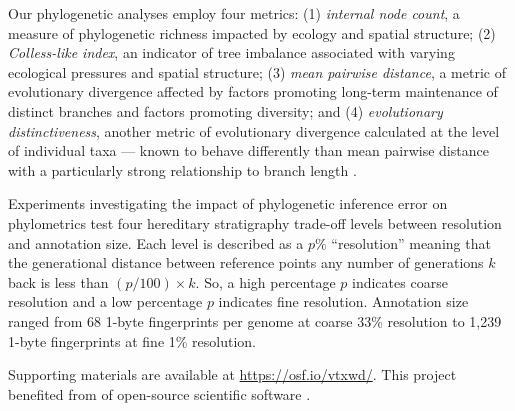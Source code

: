 Our phylogenetic analyses employ four metrics: (1) \textit{internal node count}, a measure of phylogenetic richness impacted by ecology and spatial structure; (2) \textit{Colless-like index}, an indicator of tree imbalance associated with varying ecological pressures and spatial structure; (3) \textit{mean pairwise distance}, a metric of evolutionary divergence affected by factors promoting long-term maintenance of distinct branches and factors promoting diversity; and (4) \textit{evolutionary distinctiveness}, another metric of evolutionary divergence calculated at the level of individual taxa --- known to behave differently than mean pairwise distance with a particularly strong relationship to branch length \citep{tuckerGuidePhylogeneticMetrics2017}.

Experiments investigating the impact of phylogenetic inference error on phylometrics test four hereditary stratigraphy trade-off levels between resolution and annotation size.
Each level is described as a $p\%$ ``resolution'' meaning that the generational distance between reference points any number of generations $k$ back is less than $(p / 100) \times k$.
So, a high percentage $p$ indicates coarse resolution and a low percentage $p$ indicates fine resolution.
Annotation size ranged from 68 1-byte fingerprints per genome at coarse 33\% resolution to 1,239 1-byte fingerprints at fine 1\% resolution.

Supporting materials are available at \url{https://osf.io/vtxwd/}.
This project benefited from of open-source scientific software \citep{ofria2020empirical,moreno2022hstrat,lalejini2019data,sukumaran2010dendropy}.
